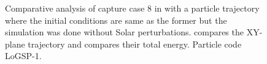 \begin{figure}[htb]
\caption{Comparative analysis of capture case 8 in  with a particle trajectory where the initial conditions are same as the former but the simulation was done without Solar perturbations.  compares the XY-plane trajectory and  compares their total energy. Particle code LoGSP-1.}
\label{fig:LoGSP_1_capture_case_8_comparative analysis_trajectory_and_energy}
\end{figure}
\FloatBarrier
